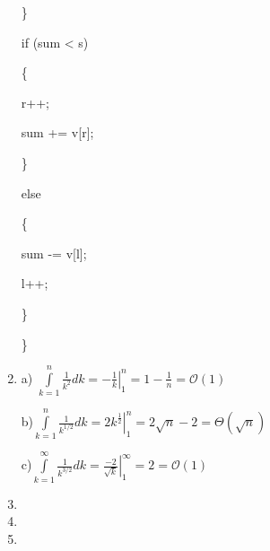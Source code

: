 \documentclass[12pt]{article}
\begin{document}
\begin{enumerate}
        \qquad \}
        
        \qquad if (sum < s)
        
        \qquad \{
        
           \qquad \qquad  r++;
            
            \qquad \qquad sum += v[r];
            
        \qquad \}
        
        \qquad else
        
        \qquad \{
        
           \qquad \qquad  sum -= v[l];
            
            \qquad \qquad l++;
            
        \qquad \}
        
    \}

\item %
a) $\int\limits_{k = 1}^{n}\frac{1}{k^2}dk = \left.-\frac{1}{k}\right| _{1}^{n} = 1 - \frac{1}{n} = \mathcal{O}(1)$

b)$\int\limits_{k = 1}^{n}\frac{1}{k^{1/2}}dk = \left.2k^{\frac{1}{2}}\right|_1^{n} = 2\sqrt{n} - 2 = \Theta(\sqrt{n})$

c)$\int\limits_{k = 1}^{\infty}\frac{1}{k^{3/2}}dk = \left.\frac{-2}{\sqrt{k}}\right|_1^{\infty} = 2 = \mathcal{O}(1)$
\item %
\item %
\item %

\end{enumerate}
\end{document}
